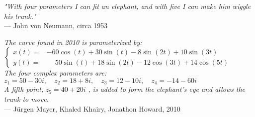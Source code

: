 \begin{flushright}
\emph{"With four parameters I can fit an elephant, and with five I can make him wiggle his trunk."}\\
— John von Neumann, circa 1953
\end{flushright}

\vspace{1.5em}


\vspace{1.5em}

\begin{flushright}
\emph{The curve found in 2010 is parameterized by:}\\[1ex]
$\left\lbrace
\begin{array}{rl}
x(t) = & -60 \cos(t) + 30 \sin(t) - 8 \sin(2t) + 10 \sin(3t) \\
y(t) = & \phantom{-}50 \sin(t) + 18 \sin(2t) - 12 \cos(3t) + 14 \cos(5t)
\end{array}
\right.$
\\[1ex]
\emph{The four complex parameters are:}\\
$z_1 = 50 - 30i,\quad z_2 = 18 + 8i,\quad z_3 = 12 - 10i,\quad z_4 = -14 - 60i$\\
\emph{A fifth point, } $z_5 = 40 + 20i$ \emph{, is added to form the elephant's eye and allows the trunk to move.}
\\
— Jürgen Mayer, Khaled Khairy, Jonathon Howard, 2010
\end{flushright}

